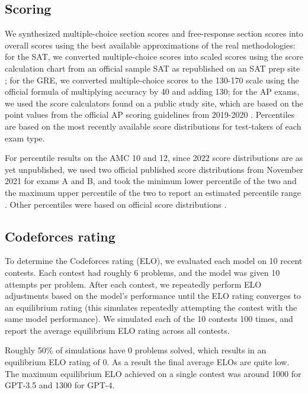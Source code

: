 \documentclass{article}
\begin{document}
\subsection{Scoring}\label{appendix:exam_scoring}
We synthesized multiple-choice section scores and free-response section scores into overall scores using the best available approximations of the real methodologies: for the SAT, we converted multiple-choice scores into scaled scores using the score calculation chart from an official sample SAT as republished on an SAT prep site \cite{seigel2020calculate}; for the GRE, we converted multiple-choice scores to the 130-170 scale using the official formula of multiplying accuracy by 40 and adding 130; for the AP exams, we used the score calculators found on a public study site, which are based on the point values from the official AP scoring guidelines from 2019-2020 \cite{albertio_blog}. Percentiles are based on the most recently available score distributions for test-takers of each exam type.

For percentile results on the AMC 10 and 12, since 2022 score distributions are as yet unpublished, we used two official published score distributions from November 2021 for exams A and B, and took the minimum lower percentile of the two and the maximum upper percentile of the two to report an estimated percentile range \cite{amc_statistics}. Other percentiles were based on official score distributions \cite{sat_percentiles_and_score_rankings} \cite{understanding_sat_scores} \cite{ap_score_distributions_by_subject_2022} \cite{usabo_semifinal_exam_histogram_2020} \cite{magoosh_gre_score_percentiles}.

\subsection{Codeforces rating}

To determine the Codeforces rating (ELO), we evaluated each model on 10 recent contests. Each contest had roughly 6 problems, and the model was given 10 attempts per problem. After each contest, we repeatedly perform ELO adjustments based on the model's performance until the ELO rating converges to an equilibrium rating (this simulates repeatedly attempting the contest with the same model performance). We simulated each of the 10 contests 100 times, and report the average equilibrium ELO rating across all contests.

Roughly 50\% of simulations have 0 problems solved, which results in an equilibrium ELO rating of 0. As a result the final average ELOs are quite low. The maximum equilibrium ELO achieved on a single contest was around 1000 for GPT-3.5 and 1300 for GPT-4. 
\end{document}
